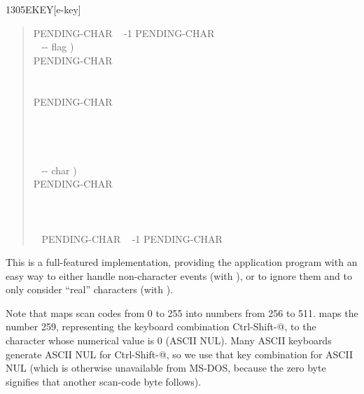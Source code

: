 \begin{worddef}{1305}{EKEY}[e-key]
\begin{defer}
\begin{quote}
\begin{tabbing}
			 PENDING-CHAR ~ -1 PENDING-CHAR \word{!} \\[\parskip]

			\+ \word{:} ~  -{}- flag ) \\
				\+ PENDING-CHAR    \\
					\+ ~   \\
						\+    \\
						\-	PENDING-CHAR \word{!}~   \\
					\-   \\
				\- ~   \\
			\- ~  \\
			\word{;} \\[\parskip]

			\+ \word{:} ~  -{}- char ) \\
				\+ PENDING-CHAR    \\
					~ ~    \\
					\>  \\
				\-	~  \\
			\- ~ PENDING-CHAR ~ -1 PENDING-CHAR \word{!} \\
			\word{;}
			\end{tabbing}
		\end{quote}

		This is a full-featured implementation, providing the
		application program with an easy way to either handle
		non-character events (with ), or to ignore them
		and to only consider ``real'' characters (with
		).

		Note that  maps scan codes from 0 to 255 into
		numbers from 256 to 511.  maps the number 259,
		representing the keyboard combination Ctrl-Shift-@, to the
		character whose numerical value is 0 (ASCII NUL). Many ASCII
		keyboards generate ASCII NUL for Ctrl-Shift-@, so we use that
		key combination for ASCII NUL (which is otherwise unavailable
		from MS-DOS, because the zero byte signifies that another
		scan-code byte follows).


\end{defer}
\end{worddef}
